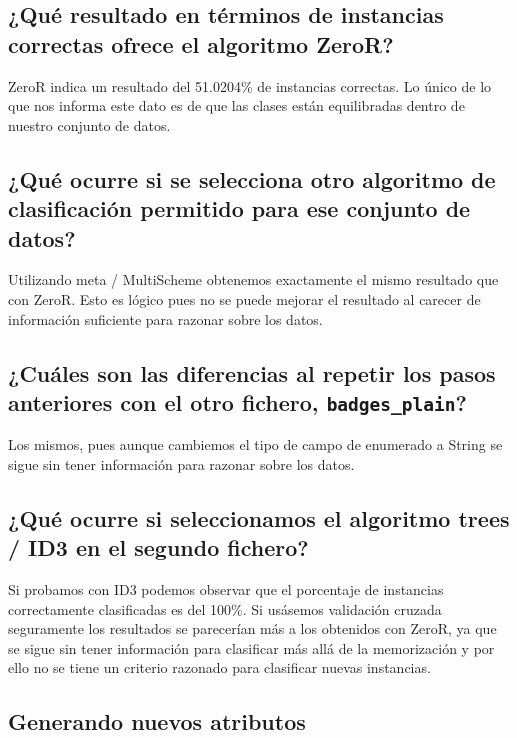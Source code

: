 \documentclass[12pt]{article}
\begin{document}
\subsection*{\small ¿Qué resultado en términos de instancias correctas ofrece el
algoritmo ZeroR?}

ZeroR indica un resultado del 51.0204\% de instancias correctas. Lo único de lo
que nos informa este dato es de que las clases están equilibradas dentro de
nuestro conjunto de datos.

\subsection*{\small ¿Qué ocurre si se selecciona otro algoritmo de clasificación
permitido para ese conjunto de datos?}

Utilizando meta / MultiScheme obtenemos exactamente el mismo resultado que con
ZeroR. Esto es lógico pues no se puede mejorar el resultado al carecer de
información suficiente para razonar sobre los datos.

\subsection*{\small ¿Cuáles son las diferencias al repetir los pasos anteriores
con el otro fichero, \texttt{badges\_plain}?}

Los mismos, pues aunque cambiemos el tipo de campo de enumerado a String se
sigue sin tener información para razonar sobre los datos.

\subsection*{\small ¿Qué ocurre si seleccionamos el algoritmo trees / ID3 en el
segundo fichero?}

Si probamos con ID3 podemos observar que el porcentaje de instancias
correctamente clasificadas es del 100\%. Si usásemos validación cruzada
seguramente los resultados se parecerían más a los obtenidos con ZeroR, ya que
se sigue sin tener información para clasificar más allá de la memorización y
por ello no se tiene un criterio razonado para clasificar nuevas instancias.

\newpage

\begin{center}
\section{Generando nuevos atributos}
\end{center}
\end{document}
